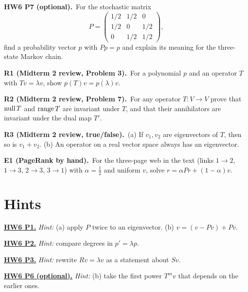 \documentclass[10pt]{scrartcl}
\begin{document}
\begin{prob}\textbf{HW6 P7 (optional).}\ For the stochastic matrix
\[
  P = \begin{pmatrix} 1/2 & 1/2 & 0 \\ 1/2 & 0 & 1/2 \\ 0 & 1/2 & 1/2 \end{pmatrix},
\]
find a probability vector $p$ with $Pp=p$ and explain its meaning for the three-state Markov chain.
\end{prob}
\begin{prob}\textbf{R1 (Midterm 2 review, Problem 3).}\ For a polynomial $p$ and an operator $T$ with $Tv=\lambda v$, show $p(T)v=p(\lambda)v$.
\end{prob}
\begin{prob}\textbf{R2 (Midterm 2 review, Problem 7).}\ For any operator $T\colon V\to V$ prove that $\operatorname{null} T$ and $\operatorname{range} T$ are invariant under $T$, and that their annihilators are invariant under the dual map $T'$.
\end{prob}
\begin{prob}\textbf{R3 (Midterm 2 review, true/false).}\ (a) If $v_1,v_2$ are eigenvectors of $T$, then so is $v_1+v_2$. (b) An operator on a real vector space always has an eigenvector.
\end{prob}
\begin{prob}\textbf{E1 (PageRank by hand).}\ For the three-page web in the text (links $1\to2$, $1\to3$, $2\to3$, $3\to1$) with $\alpha=\frac12$ and uniform $v$, solve $r=\alpha Pr+(1-\alpha)v$.
\end{prob}

\section*{Hints}

\par\medskip\noindent\textbf{\hyperlink{prob-HW6-P1}{HW6 P1.}} \emph{Hint:} (a) apply $P$ twice to an eigenvector. (b) $v=(v-Pv)+Pv$.

\par\medskip\noindent\textbf{\hyperlink{prob-HW6-P2}{HW6 P2.}} \emph{Hint:} compare degrees in $p'=\lambda p$.

\par\medskip\noindent\textbf{\hyperlink{prob-HW6-P3}{HW6 P3.}} \emph{Hint:} rewrite $Rv=\lambda v$ as a statement about $Sv$.

\par\medskip\noindent\textbf{\hyperlink{prob-HW6-P6}{HW6 P6 (optional).}} \emph{Hint:} (b) take the first power $T^mv$ that depends on the earlier ones.
\end{document}

